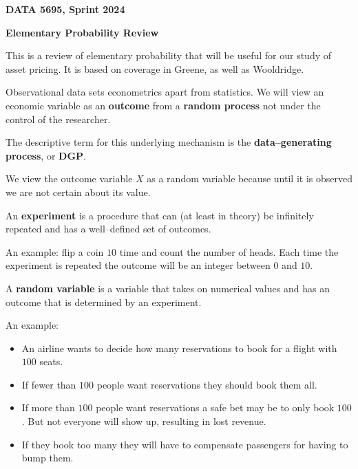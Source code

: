 \documentclass[11pt]{article}
\begin{document}
\pagestyle{empty}

\textbf{DATA 5695, Sprint 2024}

\vspace{3.5mm}

\textbf{Elementary Probability Review}
\vspace{3.5mm}


This is a review of elementary probability that will be useful for our study of asset pricing. It is based on
coverage in Greene, as well as Wooldridge.

\vspace{3.5mm}

Observational data sets econometrics apart from statistics.  We will view an economic variable as an \textbf{outcome}
from a \textbf{random process} not under the control of the researcher.

\vspace{2mm}

The descriptive term for this underlying mechanism is the \textbf{data--generating process}, or \textbf{DGP}.

\vspace{2mm}

We view the outcome variable $X$ as a random variable because until it is observed we are not certain about its value.

\vspace{2mm}

An \textbf{experiment} is a procedure that can (at least in theory) be infinitely repeated and has a well--defined set 
of outcomes.

\vspace{2mm}
An example: flip a coin $10$ time and count the number of heads. Each time the experiment is repeated the outcome will 
be an integer between $0$ and $10$.

\vspace{2mm}

A \textbf{random variable} is a variable that takes on numerical values and has an outcome that is determined by an experiment.
\vspace{2mm}

An example: 

\begin{itemize}
 \item An airline wants to decide how many reservations to book for a flight with $100$ seats.
 \item If fewer than $100$ people want reservations they should book them all.
 \item If more than $100$ people want reservations a safe bet may be to only book $100$. But not everyone will show up, resulting
       in lost revenue.
 \item If they book too many they will have to compensate passengers for having to bump them.
\end{itemize}
\end{document}
